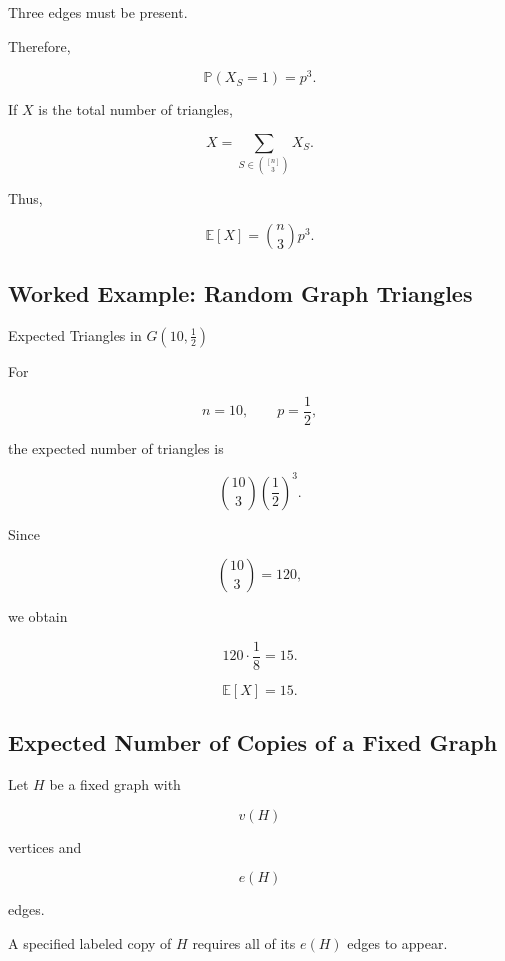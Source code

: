 Three edges must be present.

Therefore,

\[
\mathbb{P}(X_S=1)
=
p^3.
\]

If \(X\) is the total number of triangles,

\[
X
=
\sum_{S\in\binom{[n]}3}X_S.
\]

Thus,

\[
\boxed{
\mathbb{E}[X]
=
\binom{n}{3}p^3.
}
\]

\subsection{Worked Example: Random Graph Triangles}
\label{subsec:worked-random-triangles}

\begin{workedexamplebox}{Expected Triangles in \(G(10,\tfrac12)\)}

For

\[
n=10,
\qquad
p=\frac12,
\]

the expected number of triangles is

\[
\binom{10}{3}
\left(\frac12\right)^3.
\]

Since

\[
\binom{10}{3}=120,
\]

we obtain

\[
120\cdot\frac18=15.
\]

\begin{answerbox}
\[
\boxed{
\mathbb{E}[X]=15.
}
\]
\end{answerbox}

\end{workedexamplebox}

\subsection{Expected Number of Copies of a Fixed Graph}
\label{subsec:expected-fixed-subgraph}

Let \(H\) be a fixed graph with

\[
v(H)
\]

vertices and

\[
e(H)
\]

edges.

A specified labeled copy of \(H\) requires all of its \(e(H)\) edges to
appear.

